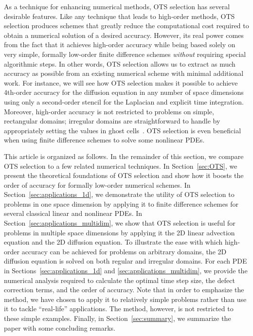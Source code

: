 \documentclass[fleqn,12pt,twoside]{article}
\begin{document}
As a technique for enhancing numerical methods, OTS selection has several
desirable features.  Like any technique that leads to high-order methods,
OTS selection produces schemes that greatly reduce the computational cost
required to obtain a numerical solution of a desired accuracy.  However, its
real power comes from the fact that it achieves high-order accuracy while
being based solely on very simple, formally low-order finite difference
schemes \emph{without} requiring special algorithmic steps.  In other words,
OTS selection allows us to extract as much accuracy as possible from an
existing numerical scheme with minimal additional work.  For instance, we will
see how OTS selection makes it possible to achieve 4th-order accuracy for the
diffusion equation in any number of space dimensions using only a second-order
stencil for the Laplacian and explicit time integration.  Moreover, high-order
accuracy is not restricted to problems on simple, rectangular domains;
irregular domains are straightforward to handle by appropriately setting the
values in ghost cells~\cite{gibou_2005,ito_2005,fedkiw_1999,osher_fedkiw_book}.  
OTS selection is even beneficial when using finite difference schemes to solve
some nonlinear PDEs.  

This article is organized as follows.  In the remainder of this section,
we compare OTS selection to a few related numerical techniques.
In Section~\ref{sec:OTS}, we present the theoretical foundations of 
OTS selection and show how it boosts the order of accuracy for formally
low-order numerical schemes.  
In Section~\ref{sec:applications_1d}, we demonstrate the utility of 
OTS selection to problems in one space dimension by applying it to finite 
difference schemes for several classical linear and nonlinear PDEs.  
In Section~\ref{sec:applications_multidim}, we show that 
OTS selection is useful for problems in multiple space dimensions by applying
it the 2D linear advection equation and the 2D diffusion equation.  To
illustrate the ease with which high-order accuracy can be achieved for
problems on arbitrary domains, the 2D diffusion equation is solved on both
regular and irregular domains.  For each PDE in
Sections~\ref{sec:applications_1d} and \ref{sec:applications_multidim}, we
provide the numerical analysis required to calculate the optimal time step
size, the defect correction terms, and the order of accuracy.  Note that in
order to emphasize the method, we have chosen to apply it to relatively simple
problems rather than use it to tackle ``real-life'' applications.  The method,
however, is not restricted to these simple examples.  Finally, in
Section~\ref{sec:summary}, we summarize the paper with some concluding
remarks.
\end{document}
